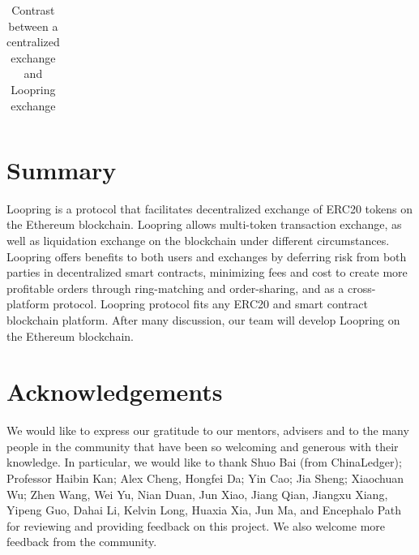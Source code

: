 \documentclass[UTF8,nofonts]{article}
\begin{document}
\begin{table}[hbt]
\begin{tabular}{p{5cm}|p{2.5cm}|p{2.5cm}}
  \end{tabular}

\caption{Contrast between a centralized exchange and Loopring exchange} %
\end{table}



\section{Summary\label{sec: summary}}

Loopring is a protocol that facilitates decentralized exchange of ERC20 tokens on the Ethereum blockchain. Loopring allows multi-token transaction exchange, as well as liquidation exchange on the blockchain under different circumstances. Loopring offers benefits to both users and exchanges by deferring risk from both parties in decentralized smart contracts, minimizing fees and cost to create more profitable orders through ring-matching and order-sharing, and as a cross-platform protocol. Loopring protocol fits any ERC20 and smart contract blockchain platform. After many discussion,  our team will develop Loopring on the Ethereum blockchain.

\section{Acknowledgements\label{sec: acknowledgement}}

We would like to express our gratitude to our mentors, advisers and to the many people in the community that have been so welcoming and generous with their knowledge. In particular, we would like to thank Shuo Bai (from ChinaLedger); Professor Haibin Kan; Alex Cheng, Hongfei Da; Yin Cao; Jia Sheng; Xiaochuan Wu; Zhen Wang, Wei Yu, Nian Duan, Jun Xiao, Jiang Qian, Jiangxu Xiang, Yipeng Guo, Dahai Li, Kelvin Long, Huaxia Xia, Jun Ma, and Encephalo Path for reviewing and providing feedback on this project. We also welcome more feedback from the community.

\newpage  


\end{document}

